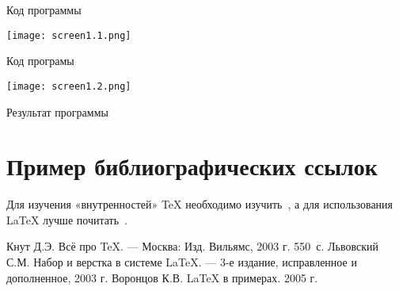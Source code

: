 \documentclass[12pt,a4paper]{scrartcl}
\begin{document}
Код программы 

\texttt{[image: screen1.1.png]}

Код програмы

\texttt{[image: screen1.2.png]}

Результат программы

\section{Пример библиографических ссылок}

Для изучения «внутренностей» \TeX{} необходимо 
изучить~\cite{Knuth-2003}, а для использования \LaTeX{} лучше
почитать~\cite{Lvovsky-2003, Voroncov-2005}.

\begin{thebibliography}{9}
Кнут Д.Э. Всё про \TeX. \newblock --- Москва: Изд. Вильямс, 2003 г. 550~с.
Львовский С.М. Набор и верстка в системе \LaTeX{}. \newblock --- 3-е издание, исправленное и дополненное, 2003 г.
Воронцов К.В. \LaTeX{} в примерах. 2005 г.
\end{thebibliography}
\end{document}
